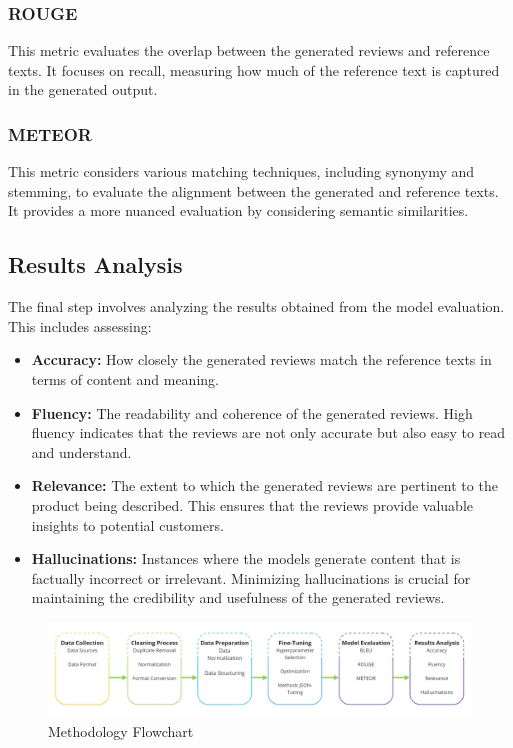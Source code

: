 \subsubsection{ROUGE}
This metric evaluates the overlap between the generated reviews and reference texts. It focuses on recall, measuring how much of the reference text is captured in the generated output.

\subsubsection{METEOR}
This metric considers various matching techniques, including synonymy and stemming, to evaluate the alignment between the generated and reference texts. It provides a more nuanced evaluation by considering semantic similarities.

\subsection{Results Analysis}
The final step involves analyzing the results obtained from the model evaluation. This includes assessing:

\begin{itemize}
    \item \textbf{Accuracy:} How closely the generated reviews match the reference texts in terms of content and meaning.
    \item \textbf{Fluency:} The readability and coherence of the generated reviews. High fluency indicates that the reviews are not only accurate but also easy to read and understand.
    \item \textbf{Relevance:} The extent to which the generated reviews are pertinent to the product being described. This ensures that the reviews provide valuable insights to potential customers.
    \item \textbf{Hallucinations:} Instances where the models generate content that is factually incorrect or irrelevant. Minimizing hallucinations is crucial for maintaining the credibility and usefulness of the generated reviews.
\end{itemize}

\begin{figure}[H]
    \centering
    \includegraphics[width=12cm]{images/Methodology.jpg}
    \caption{Methodology Flowchart}
    \label{fig:MethodologyFlowchart}
\end{figure}